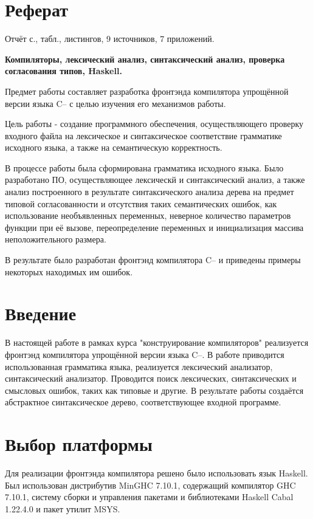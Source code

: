 \documentclass[a4paper,12pt]{report}
\numberwithin{equation}{section}
\begin{document}
 

\setcounter{page}{3}

\section*{Реферат}
Отчёт \pageref{LastPage}с., \totaltables табл., \totallstlistings листингов, 9 источников, 7 приложений.

\noindent \textbf{Компиляторы, лексический анализ, синтаксический анализ, проверка согласования типов, Haskell.} 

Предмет работы составляет разработка фронтэнда компилятора упрощённой версии языка C-- с целью изучения его механизмов работы.

Цель работы - создание программного обеспечения, осуществляющего проверку входного
файла на лексическое и синтаксическое соответствие грамматике исходного языка,
а также на семантическую корректность.

В процессе работы была сформирована грамматика исходного языка.
Было разработано ПО, осуществляющее лексическй и синтаксический анализ,
а также анализ построенного в результате синтаксического анализа дерева
на предмет типовой согласованности и отсутствия таких семантических ошибок,
как использование необъявленных переменных, неверное количество параметров функции при её вызове,
переопределение переменных и инициализация массива неположительного размера.

В результате было разработан фронтэнд компилятора C-- и приведены примеры некоторых находимых им ошибок.

\tableofcontents

\section{Введение}
В настоящей работе в рамках курса "конструирование компиляторов" реализуется фронтэнд компилятора упрощённой версии языка C--.
В работе приводится использованная грамматика языка, реализуется лексический анализатор, синтаксический анализатор.
Проводится поиск лексических, синтаксических и смысловых ошибок, таких как типовые и другие.
В результате работы создаётся абстрактное синтаксическое дерево, соответствующее входной программе.

\section{Выбор платформы}
Для реализации фронтэнда компилятора решено было использовать язык Haskell.
Был использован дистрибутив MinGHC 7.10.1\cite{minghc}, содержащий компилятор GHC 7.10.1\cite{ghc}, систему сборки и управления пакетами и библиотеками Haskell Cabal 1.22.4.0\cite{cabal} и пакет утилит MSYS\cite{msys}.
\end{document}
